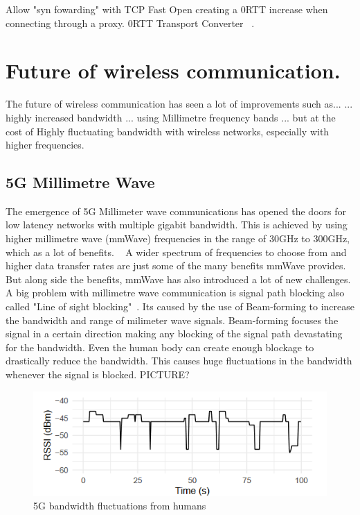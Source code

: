 \documentclass[a4paper,english, 11pt]{report}
\begin{document}
Allow "syn fowarding" with TCP Fast Open creating a 0RTT increase when connecting through a proxy.
0RTT Transport Converter ~\cite{rfc8803}.


\section{Future of wireless communication.}
The future of wireless communication has seen a lot of improvements such as...
... highly increased bandwidth ... using Millimetre frequency bands ... but at the cost of Highly fluctuating bandwidth with wireless networks, especially with higher frequencies.\\ 

\subsection{5G Millimetre Wave}
The emergence of 5G Millimeter wave communications has opened the doors for low latency networks with multiple gigabit bandwidth. This is achieved by using higher millimetre wave (mmWave) frequencies in the range of 30GHz to 300GHz, which as a lot of benefits. ~\cite{Agrawal_Sharma_2016} A wider spectrum of frequencies to choose from and higher data transfer rates are just some of the many benefits mmWave provides. But along side the benefits, mmWave has also introduced a lot of new challenges.\\

A big problem with millimetre wave communication is signal path blocking also called "Line of sight blocking"~\cite{mmwave_blocking}. Its caused by the use of Beam-forming to increase the bandwidth and range of milimeter wave signals. Beam-forming focuses the signal in a certain direction making any blocking of the signal path devastating for the bandwidth. Even the human body can create enough blockage to drastically reduce the bandwidth. This causes huge fluctuations in the bandwidth whenever the signal is blocked. PICTURE?\\
\begin{figure} %
	\centering
	\includegraphics[scale=1.25]{../diagrams/graphs/tcp_mmwave_blockage.png}
  	\caption{5G bandwidth fluctuations from humans}
  	\label{fig:blockage}
\end{figure}
\end{document}
